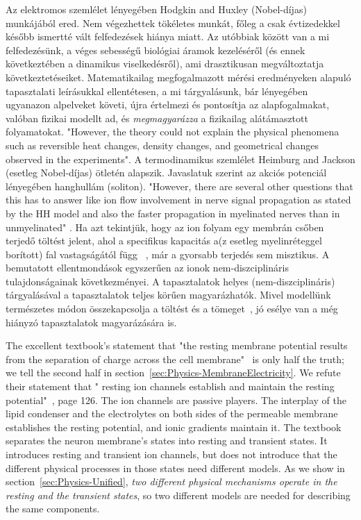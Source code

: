 \else


Az elektromos szemlélet lényegében Hodgkin and Huxley (Nobel-díjas) \cite{HodgkinHuxley:1952} munkájából ered.
Nem végezhettek tökéletes munkát, főleg a csak évtizedekkel később
ismertté vált felfedezések hiánya miatt. Az utóbbiak között van
a mi felfedezésünk, a véges sebességű biológiai áramok kezeléséről (és ennek következtében a dinamikus viselkedésről), ami drasztikusan
megváltoztatja következtetéseiket.
Matematikailag megfogalmazott mérési eredményeken alapuló tapasztalati leírásukkal ellentétesen, a mi tárgyalásunk, bár lényegében ugyanazon alpelveket követi, újra értelmezi és pontosítja 
az alapfogalmakat, valóban fizikai modellt ad, és \textit{megmagyarázza} a fizikailag alátámasztott folyama\-tokat.
"However, the theory could not explain the physical
phenomena such as reversible heat changes, density changes,
and geometrical changes observed in the experiments"\cite{ComparisonHHandSoliton:2010}.
A termodinamikus szemlélet Heimburg and Jackson \cite{SolitonPropagation:2005} (esetleg Nobel-díjas) ötletén alapszik.
Javaslatuk szerint az akciós potenciál lényegében hanghullám (soliton).
"However, there are several other questions that this has to answer like ion flow involvement in nerve signal propagation as stated by the \gls{HH} model and also the faster propagation in myelinated nerves than in unmyelinated" \cite{ComparisonHHandSoliton:2010}.
Ha azt tekintjük, hogy az ion folyam egy membrán csőben terjedő 
töltést jelent, ahol a specifikus kapacitás a(z esetleg myelinréteggel borított) fal vastagságától függ~ \cite{VeghUnifiedCrossdisciplinaryModel:2026}, már a gyorsabb terjedés sem misztikus.
A bemutatott ellentmondások egyszerűen az ionok nem-diszciplináris tulajdonságainak következményei.
A tapasztalatok helyes (nem-diszciplináris) tárgyalásával
a tapasztalatok teljes körűen magyarázhatók.
Mivel modellünk természetes módon összekapcsolja a töltést és a tömeget~\cite{VeghNon-ordinaryLaws:2025}, jó esélye van a még hiányzó tapasztalatok magyarázására is.


The excellent textbook's statement that "the resting membrane potential results
from the separation of charge across the
cell membrane"~\cite{PrinciplesNeuralScience:2013} is only half the truth; we tell the second half in section~\ref{sec:Physics-MembraneElectricity}. 
We refute their statement that "%
resting ion channels
establish and maintain the resting potential"~\cite{PrinciplesNeuralScience:2013}, page 126.
The ion channels are passive players. The interplay of 
the lipid condenser and the electrolytes on both sides
of the permeable membrane establishes the resting potential, and ionic gradients maintain it.
The textbook separates the neuron membrane's states into resting and transient states. 
It introduces resting and transient ion channels,
but does not introduce that the different physical processes in those states need different models. 
As we show in section~\ref{sec:Physics-Unified}, \textit{two different physical mechanisms
operate in the resting and the transient states}, so two different models are needed for describing the same components.
\fi


